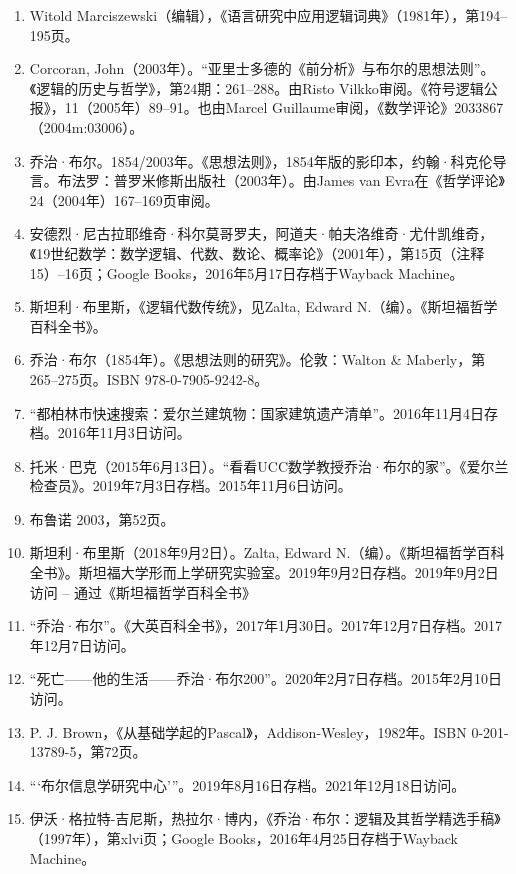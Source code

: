 \begin{enumerate}
\item Witold Marciszewski（编辑），《语言研究中应用逻辑词典》（1981年），第194–195页。
\item Corcoran, John（2003年）。“亚里士多德的《前分析》与布尔的思想法则”。《逻辑的历史与哲学》，第24期：261–288。由Risto Vilkko审阅。《符号逻辑公报》，11（2005年）89–91。也由Marcel Guillaume审阅，《数学评论》2033867（2004m:03006）。
\item 乔治·布尔。1854/2003年。《思想法则》，1854年版的影印本，约翰·科克伦导言。布法罗：普罗米修斯出版社（2003年）。由James van Evra在《哲学评论》24（2004年）167–169页审阅。
\item 安德烈·尼古拉耶维奇·科尔莫哥罗夫，阿道夫·帕夫洛维奇·尤什凯维奇，《19世纪数学：数学逻辑、代数、数论、概率论》（2001年），第15页（注释15）–16页；Google Books，2016年5月17日存档于Wayback Machine。
\item 斯坦利·布里斯，《逻辑代数传统》，见Zalta, Edward N.（编）。《斯坦福哲学百科全书》。
\item 乔治·布尔（1854年）。《思想法则的研究》。伦敦：Walton & Maberly，第265–275页。ISBN 978-0-7905-9242-8。
\item “都柏林市快速搜索：爱尔兰建筑物：国家建筑遗产清单”。2016年11月4日存档。2016年11月3日访问。
\item 托米·巴克（2015年6月13日）。“看看UCC数学教授乔治·布尔的家”。《爱尔兰检查员》。2019年7月3日存档。2015年11月6日访问。
\item 布鲁诺 2003，第52页。
\item 斯坦利·布里斯（2018年9月2日）。Zalta, Edward N.（编）。《斯坦福哲学百科全书》。斯坦福大学形而上学研究实验室。2019年9月2日存档。2019年9月2日访问 – 通过《斯坦福哲学百科全书》
\item “乔治·布尔”。《大英百科全书》，2017年1月30日。2017年12月7日存档。2017年12月7日访问。
\item “死亡——他的生活——乔治·布尔200”。2020年2月7日存档。2015年2月10日访问。
\item P. J. Brown，《从基础学起的Pascal》，Addison-Wesley，1982年。ISBN 0-201-13789-5，第72页。
\item “‘布尔信息学研究中心’”。2019年8月16日存档。2021年12月18日访问。
\item 伊沃·格拉特-吉尼斯，热拉尔·博内，《乔治·布尔：逻辑及其哲学精选手稿》（1997年），第xlvi页；Google Books，2016年4月25日存档于Wayback Machine。

\end{enumerate}
